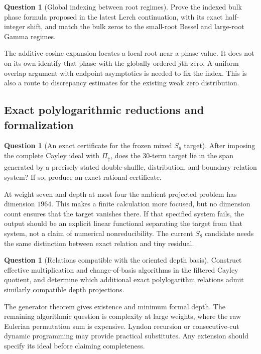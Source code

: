 \documentclass[11pt,a4paper]{article}
\numberwithin{equation}{section}
\theoremstyle{definition}
\newtheorem{question}[theorem]{Question}
\theoremstyle{remark}
\begin{document}
\begin{question}[Global indexing between root regimes]
Prove the indexed bulk phase formula proposed in the latest Lerch
continuation, with its exact half-integer shift, and match the bulk
zeros to the small-root Bessel and large-root Gamma regimes.
\end{question}
The additive cosine expansion locates a local root near a phase value.
It does not on its own identify that phase with the globally ordered
$j$th zero. A uniform overlap argument with endpoint asymptotics is
needed to fix the index. This is also a route to discrepancy estimates
for the existing weak zero distribution.

\subsection{Exact polylogarithmic reductions and formalization}

\begin{question}[An exact certificate for the frozen mixed $S_6$ target]
After imposing the complete Cayley ideal with
$\Pi_{\uparrow}$, does the 30-term target lie in the span generated
by a precisely stated double-shuffle, distribution, and boundary
relation system? If so, produce an exact rational certificate.
\end{question}
At weight seven and depth at most four the ambient projected problem
has dimension $1964$. This makes a finite calculation more focused,
but no dimension count ensures that the target vanishes there.
If that specified system fails, the output should be an explicit
linear functional separating the target from that system, not a
claim of numerical nonreducibility. The current $S_8$ candidate needs
the same distinction between exact relation and tiny residual.

\begin{question}[Relations compatible with the oriented depth basis]
Construct effective multiplication and change-of-basis algorithms in
the filtered Cayley quotient, and determine which additional exact
polylogarithm relations admit similarly compatible depth projections.
\end{question}
The generator theorem gives existence and minimum formal depth. The
remaining algorithmic question is complexity at large weights, where
the raw Eulerian permutation sum is expensive. Lyndon recursion or
consecutive-cut dynamic programming may provide practical substitutes.
Any extension should specify its ideal before claiming completeness.
\end{document}
